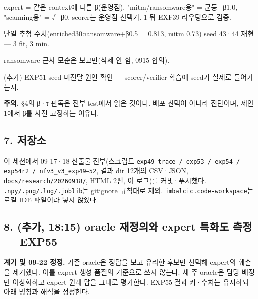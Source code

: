 \par\noindent \textbullet\enspace expert =\allowbreak{} 같은 context에 다른 β(운영점). "mitm/\allowbreak{}ransomware용" =\allowbreak{} 균등+\allowbreak{}β1.0, "scanning용" =\allowbreak{} √+\allowbreak{}β0. scorer는 운영점 선택기. 1 뒤 EXP39 라우팅으로 검증.


\par\noindent \textbullet\enspace 단일 추첨 수치(enriched30:ransomware+\allowbreak{}β0.5 =\allowbreak{} 0.813, mitm 0.73) seed 43·44 재현 — 3 fit, 3 min.


\par\noindent \textbullet\enspace ransomware 근사 모순은 보고만(삭제 안 함, 0915 합의).


\par\noindent \textbullet\enspace (추가) EXP51 seed 미전달 원인 확인 — scorer/\allowbreak{}verifier 학습에 seed가 실제로 들어가는지.


\textbf{주의.} §4의 β·τ 판독은 전부 test에서 읽은 것이다. 배포 선택이 아니라 진단이며, 제안 1에서 β를 사전 고정하는 이유다.

\subsection{7. 저장소}
이 세션에서 09-17·18 산출물 전부(스크립트 \texttt{exp49\_\allowbreak{}\allowbreak{}tr\allowbreak{}ace /\allowbreak{}\allowbreak{} ex\allowbreak{}p53 /\allowbreak{}\allowbreak{} ex\allowbreak{}p54 /\allowbreak{}\allowbreak{} ex\allowbreak{}p54r2 /\allowbreak{}\allowbreak{} \allowbreak{}nfv3\_\allowbreak{}\allowbreak{}v3\_\allowbreak{}\allowbreak{}exp49–52\allowbreak{}}, 결과 dir 12개의 CSV·JSON, \texttt{docs/\allowbreak{}\allowbreak{}res\allowbreak{}earch/\allowbreak{}\allowbreak{}20\allowbreak{}260918/\allowbreak{}\allowbreak{}}, HTML 2편, 이 로그)를 커밋·푸시했다. \texttt{.\allowbreak{}npy/\allowbreak{}\allowbreak{}.\allowbreak{}pn\allowbreak{}g/\allowbreak{}\allowbreak{}.\allowbreak{}log/\allowbreak{}\allowbreak{}.\allowbreak{}joblib}는 gitignore 규칙대로 제외. \texttt{imbalcic\allowbreak{}.\allowbreak{}code-\allowbreak{}wo\allowbreak{}rkspace}는 로컬 IDE 파일이라 넣지 않았다.

\subsection{8. (추가, 18:15) oracle 재정의와 expert 특화도 측정 — EXP55}
\textbf{계기 및 09-22 정정.} 기존 oracle은 정답을 보고 유리한 후보만 선택해 expert의 훼손을 제거했다. 이를 expert 생성 품질의 기준으로 쓰지 않는다. 새 주 oracle은 담당 배정만 이상화하고 expert 원래 답을 그대로 평가한다. EXP55 결과 키·수치는 유지하되 아래 명칭과 해석을 정정한다.

